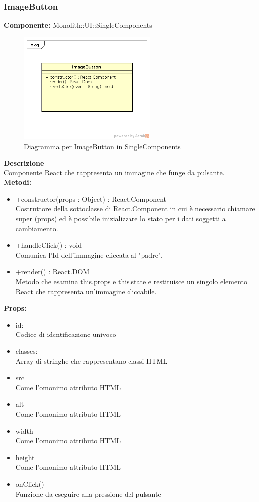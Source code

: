 \subsubsection{ImageButton}
\textbf{Componente:}  Monolith::UI::SingleComponents\\
   \FloatBarrier
   \begin{figure}[ht]
   \centering
   \includegraphics[width=0.6\textwidth]{img/single-ImageButton.png}
   \caption{{Diagramma per ImageButton in SingleComponents}}
\end{figure}
\FloatBarrier
\textbf{Descrizione}\\
Componente React che rappresenta un immagine che funge da pulsante. \\
\textbf{Metodi:} 
\begin{itemize}
\item +constructor(props : Object) : React.Component 
\\
Costruttore della sottoclasse di React.Component in cui è necessario chiamare super (props) ed è possibile inizializzare lo stato per i dati soggetti a cambiamento.
\item +handleClick() : void 
\\
Comunica l'Id dell'immagine cliccata al "padre". 
\item +render() : React.DOM 
\\
Metodo che esamina this.props e this.state e restituisce un singolo elemento React che rappresenta un'immagine cliccabile.
\end{itemize}

\textbf{Props:} 
\begin{itemize}
\item id: 
\\
Codice di identificazione univoco
\item classes: 
\\
Array di stringhe che rappresentano classi HTML
\item src
\\
Come l'omonimo attributo HTML
\item alt
\\
Come l'omonimo attributo HTML
\item width
\\
Come l'omonimo attributo HTML
\item height
\\
Come l'omonimo attributo HTML
\item onClick()
\\
Funzione da eseguire alla pressione del pulsante

\end{itemize} 


